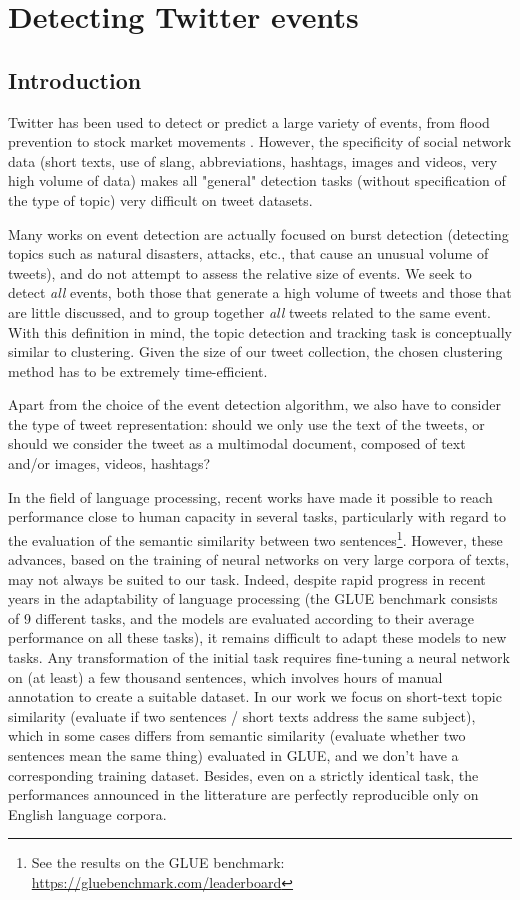 \chapter{Detecting Twitter events}


\section{Introduction}
Twitter has been used to detect or predict a large variety of events,
from flood prevention \cite{de2017towards} to stock market movements
\cite{pagolu2016sentiment}. However, the specificity of social network data (short texts, use of
slang, abbreviations, hashtags, images and videos, very
high volume of data) makes all "general" detection tasks
(without specification
of the type of topic)
very difficult on tweet datasets.

Many works on event detection are actually
focused on burst detection (detecting topics such as
natural disasters, attacks, etc., that cause an unusual
volume of tweets), and do not attempt to assess the
relative size of events. We seek to detect \textit{all} events, both
those that generate a high volume of tweets and those that
are little discussed, and to group together \textit{all} tweets
related to the same event. With this definition in mind, the
topic detection and tracking task is conceptually similar to 
clustering. Given the size of our tweet collection, 
the chosen clustering method has to be extremely time-efficient.

Apart from the choice of the event detection algorithm, 
we also have to consider the type of tweet representation: 
should we only use the text of the tweets, or should we consider 
the tweet as a multimodal document, composed of text and/or images, videos, hashtags?

In the field of language processing, recent works
have made it possible to reach performance close to human capacity
in several tasks, 
particularly with regard to the evaluation of the semantic similarity 
between two sentences\footnote{See the results on the GLUE benchmark: \url{https://gluebenchmark.com/leaderboard}}. However, these advances, 
based on the training of neural networks on very large corpora of texts,
may not always be suited to our task. Indeed, despite rapid progress 
in recent years in the adaptability of
language processing (the GLUE benchmark \cite{wang2018glue} consists of
9 different tasks, and the models are evaluated according to their average performance on
all these tasks), it remains difficult to adapt these models to new tasks. 
Any transformation of the initial task requires fine-tuning a neural network 
on (at least) a few thousand sentences, which
involves hours of manual annotation to create a suitable dataset. 
In our work we focus on short-text topic similarity (evaluate if two sentences / short texts
address the same subject), which in some cases differs from semantic similarity
(evaluate whether two sentences mean the same thing) evaluated in GLUE, and we don't 
have a corresponding training dataset. Besides, even on a strictly identical
task, the performances announced in the litterature are perfectly reproducible 
only on English language corpora. 

